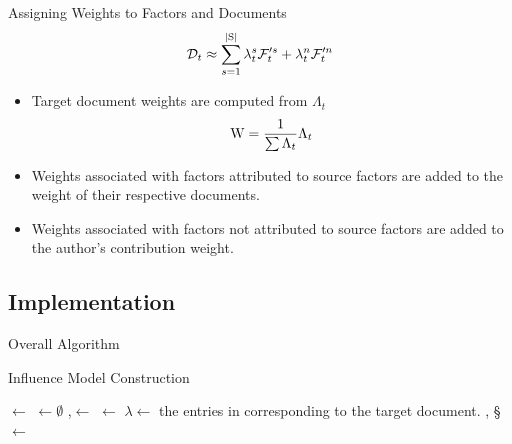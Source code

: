 \documentclass[handout]{beamer}
\begin{document}
\begin{frame}{Assigning Weights to Factors and Documents}
  \[
      \mathcal{D}_t \approx \sum_{s=1}^{|\mathrm{S}|} \lambda^s_t \mathcal{F}'^s_t +
  \lambda^n_t \mathcal{F}'^n_t
\]

  \begin{itemize}[<+->]
  \item Target document weights are computed from $\Lambda_t$
    \[
      \mathrm{W} = \dfrac{1}{\sum \Lambda_t} \Lambda_t
    \]
  \item Weights associated with factors attributed to source factors
    are added to the weight of their respective documents.
  \item Weights associated with factors not attributed to source
    factors are added to the author's contribution weight.
  \end{itemize}
\end{frame}

\subsection{Implementation}
\begin{frame}{Overall Algorithm}
  \small
\begin{algorithm}[H]
  \caption{Influence Model Construction}
  \label{alg:model}

   
   
   
  
  \Output{\W, \S, \F}
  \BlankLine
  \;
  \V $\leftarrow$ \;
  \C $\leftarrow\emptyset$\;
  \LN,\F $\leftarrow$ \;
  \DM $\leftarrow$ \DistanceMatrix{\F}\;
  $\lambda \leftarrow$ the entries in \LN corresponding to the target document.\;
  \W, \S $\leftarrow$ \;
  \Return{\W, \S, \F}\;
\end{algorithm}
\end{frame}
\end{document}
